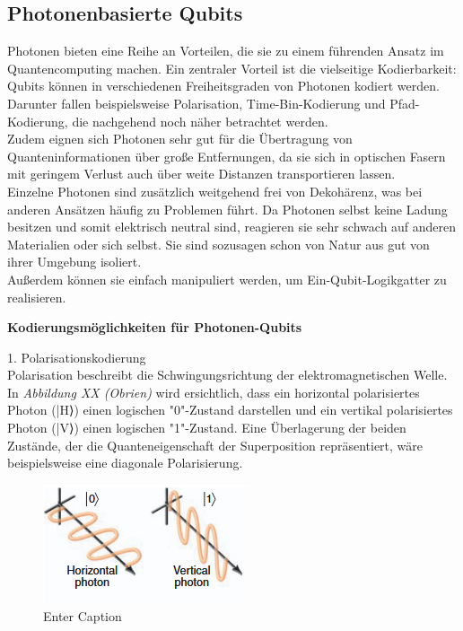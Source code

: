 \subsection{Photonenbasierte Qubits}

Photonen bieten eine Reihe an Vorteilen, die sie zu einem führenden Ansatz im Quantencomputing machen. Ein zentraler Vorteil ist die vielseitige Kodierbarkeit: Qubits können in verschiedenen Freiheitsgraden von Photonen kodiert werden. Darunter fallen beispielsweise Polarisation, Time-Bin-Kodierung und Pfad-Kodierung, die nachgehend noch näher betrachtet werden. \\
Zudem eignen sich Photonen sehr gut für die Übertragung von Quanteninformationen über große Entfernungen, da sie sich in optischen Fasern mit geringem Verlust auch über weite Distanzen transportieren lassen. \\
Einzelne Photonen sind zusätzlich weitgehend frei von Dekohärenz, was bei anderen Ansätzen häufig zu Problemen führt. Da Photonen selbst keine Ladung besitzen und somit elektrisch neutral sind, reagieren sie sehr schwach auf anderen Materialien oder sich selbst. Sie sind sozusagen schon von Natur aus gut von ihrer Umgebung isoliert. \\
Außerdem können sie einfach manipuliert werden, um Ein-Qubit-Logikgatter zu realisieren. 

\textbf{Kodierungsmöglichkeiten für Photonen-Qubits}

1. Polarisationskodierung\\
Polarisation beschreibt die Schwingungsrichtung der elektromagnetischen Welle. In\textit{ Abbildung XX (Obrien)} wird ersichtlich, dass ein horizontal polarisiertes Photon (|H⟩) einen logischen "0"-Zustand darstellen und ein vertikal polarisiertes Photon (|V⟩) einen logischen "1"-Zustand. Eine Überlagerung der beiden Zustände, der die Quanteneigenschaft der Superposition repräsentiert, wäre beispielsweise eine diagonale Polarisierung. 
\begin{figure}
    \centering
    \includegraphics[width=0.5\linewidth]{images/physics/Photonen_Polarisierung.png}
    \caption{Enter Caption}
    \label{fig:enter-label}
\end{figure}
\cite{obrien_optical_2007}

